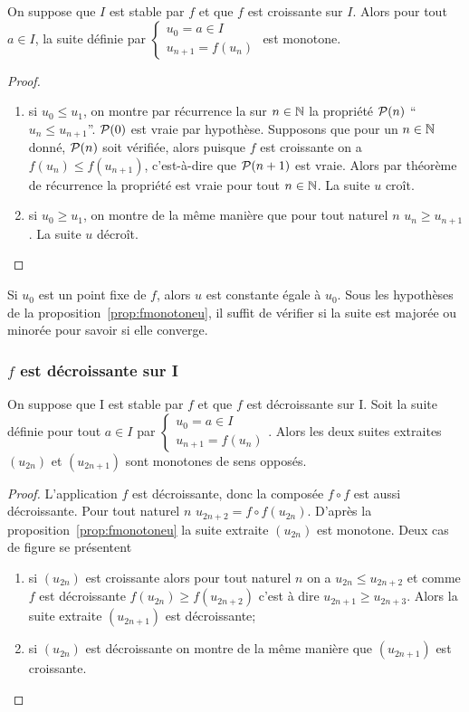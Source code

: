 \begin{prop}\label{prop:fmonotoneu}
  On suppose que $I$ est stable par $f$ et que $f$ est croissante sur $I$. Alors pour tout $a \in I$, la suite définie par $\begin{cases} u_0=a \in I \\ u_{n+1}=f(u_n) \end{cases}$ est monotone.
\end{prop}
\begin{proof}
  \begin{enumerate}
  \item si $u_0 \leq u_1$, on montre par récurrence la sur $n \in \N$ la propriété $\P(n)$ ``$u_n \leq u_{n+1}$''. $\P(0)$ est vraie par hypothèse. Supposons que pour un $n \in \N$ donné, $\P(n)$ soit vérifiée, alors puisque $f$ est croissante on a $f(u_n) \leq f(u_{n+1})$, c'est-à-dire que $\P(n+1)$ est vraie. Alors par théorème de récurrence la propriété est vraie pour tout $n \in \N$. La suite $u$ croît.
  \item si $u_0 \geq u_1$, on montre de la même manière que pour tout naturel $n$ $u_n \geq u_{n+1}$. La suite $u$ décroît.
  \end{enumerate}
\end{proof}

Si $u_0$ est un point fixe de $f$, alors $u$ est constante égale à $u_0$. Sous les hypothèses de la proposition~\ref{prop:fmonotoneu}, il suffit de vérifier si la suite est majorée ou minorée pour savoir si elle converge.

\subsubsection{$f$ est décroissante sur I}

\begin{prop}
  On suppose que I est stable par $f$ et que $f$ est décroissante sur I. Soit la suite définie pour tout $a \in I$ par $\begin{cases} u_0=a \in I \\ u_{n+1}=f(u_n) \end{cases}$. Alors les deux suites extraites $(u_{2n})$ et $(u_{2n+1})$ sont monotones de sens opposés.
\end{prop}
\begin{proof}
  L'application $f$ est décroissante, donc la composée $f \circ f$ est aussi décroissante. Pour tout naturel $n$ $u_{2n+2}=f \circ f(u_{2n})$. D'après la proposition~\ref{prop:fmonotoneu} la suite extraite $(u_{2n})$ est monotone. Deux cas de figure se présentent
  \begin{enumerate}
  \item si $(u_{2n})$ est croissante alors pour tout naturel $n$ on a $u_{2n} \leq u_{2n+2}$ et comme $f$ est décroissante $f(u_{2n}) \geq f(u_{2n+2})$ c'est à dire $u_{2n+1} \geq u_{2n+3}$. Alors la suite extraite $(u_{2n+1})$ est décroissante;
  \item si $(u_{2n})$ est décroissante on montre de la même manière que $(u_{2n+1})$ est croissante.
    \end{enumerate}
\end{proof}


